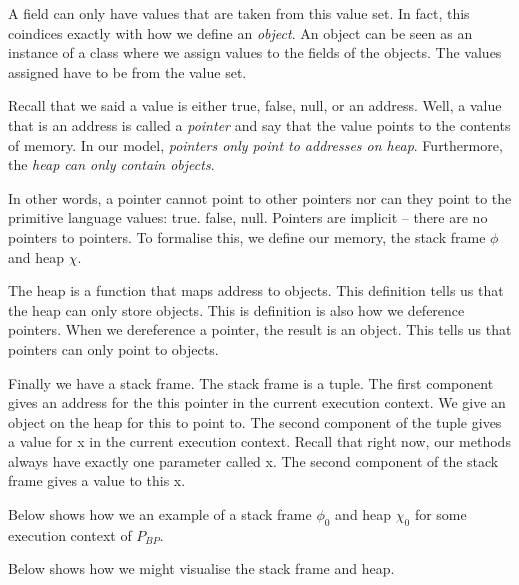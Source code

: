 A field can only have values that are taken from this value set. 
In fact, this coindices exactly with how we define an \textit{object}. 
An object can be seen as an instance 
of a class where we assign values to the fields of the objects. 
The values assigned have to be from the value set.


Recall that we said a value is either true, false, null, or 
an address. Well, a value that is an address is called a
 \textit{pointer} and say that the value points to the contents of memory.
In our model, \textit{pointers only point to addresses on heap}. 
Furthermore, the \textit{heap can only contain objects}.

In other words, a pointer cannot point to other pointers nor can they point to the primitive language values: true. false, null. Pointers are implicit – there are 
no pointers to pointers. To formalise this, we define our memory, the stack 
frame $\phi$ and heap $\chi$.


The heap is a function that maps address to objects. 
This definition tells us that the heap can only store objects. 
This is definition is also how we deference pointers. When we 
dereference a pointer, the result is an object. This tells us that 
pointers can only point to objects.

Finally we have a stack frame.
The stack frame is a tuple. The first component gives an address for the this
pointer in the current execution context. We give an object on the heap for this 
to point to. The second component of the tuple gives a value for x in the 
current execution context. Recall that right now, our methods always have exactly
one parameter called x. The second component of the stack frame gives a value to this x. 

\frmrule

\begin{example}
Below shows how we an example of a stack frame $\phi_0$ and heap $\chi_0$ 
for some execution context of $P_{BP}$. 


Below shows how we might visualise the stack frame and heap.

\end{example}

\frmrule

